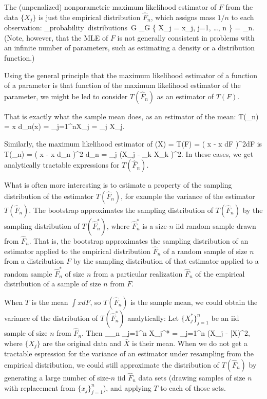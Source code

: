The (unpenalized) nonparametric maximum likelihood estimator of $F$ from the data
$\{X_j \}$ is
just the empirical distribution $\hat{F}_n$,
which assigns mass $1/n$ to each observation:
\beq
\arg \max_{\mbox{probability distributions }G}
\Prob_G \{ X_j = x_j, \; j=1, \ldots, n \}
= _n.
\eeq
(Note, however, that the MLE of $F$ is not generally consistent in
problems with an
infinite number of parameters, such as estimating a density or a
distribution function.)

Using the general principle that the maximum likelihood estimator of a
function of a parameter is that function of the maximum likelihood
estimator of the parameter, we might be led to consider $T(\hat{F}_n)$
as an estimator of $T(F)$.

That is exactly what the sample mean does, as an estimator of the mean:
\beq
        T(_n) = \int x d_n(x) = \sum_{j=1}^nX_j =
         \sum_j X_j.
\eeq

Similarly, the maximum likelihood estimator of
\beq
    \Var(X) = T(F) = \int \left ( x - \int x dF \right )^2dF
\eeq
is
\beq
        T(_n) = \int \left ( x - \int x d_n \right )^2 d_n =
        \sum_j \left (X_j -  \sum_k X_k \right )^2.
\eeq
In these cases, we get analytically tractable expressions for $T(\hat{F}_n)$.

What is often more interesting is to estimate a property of the sampling
distribution of the estimator $T(\hat{F}_n)$, for example the variance of 
the estimator $T(\hat{F}_n)$.
The bootstrap approximates the sampling distribution of
$T(\hat{F}_n)$ by the sampling distribution of  $T(\hat{F}_n^*)$,
where $\hat{F}_n^*$ is a size-$n$ iid random sample drawn
from $\hat{F}_n$.
That is, the bootstrap approximates
the sampling distribution of an estimator applied to the empirical
distribution $\hat{F}_n$ of a random sample of size
$n$ from a distribution $F$ by the sampling distribution of that estimator
applied to a random sample $\hat{F}_n^*$ of size $n$ from a particular
realization $\hat{F}_n$ of
the empirical distribution of a sample of size $n$ from $F$.

When $T$ is the mean $\int x dF$, so $T(\hat{F}_n)$ is the sample mean, 
we could obtain
the variance of the distribution of $T( \hat{F}_n^* )$ analytically:
Let $\{ X_j^* \}_{j=1}^n$ be an iid sample of size $n$ from $\hat{F}_n$.
Then
\beq
        \Var_{_n} \sum_{j=1}^n X_j^*
        =  \sum_{j=1}^n (X_j - \bar{X})^2,
\eeq
where $\{ X_j \}$ are the original data and $\bar{X}$ is their mean.
When we do not get a tractable espression
for the variance of an estimator under resampling from the empirical
distribution, we could still approximate the distribution of
$T(\hat{F}_n)$ by generating a large number of
size-$n$ iid $\hat{F}_n$ data sets (drawing samples of
size $n$ with replacement from $\{ x_j \}_{j=1}^n$), and applying 
$T$ to each of those sets.


